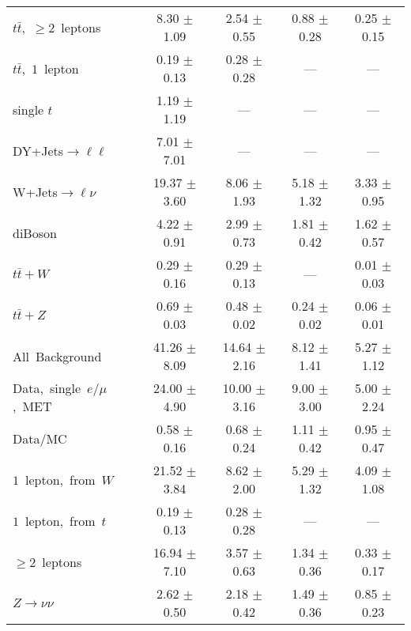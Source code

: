 \documentclass{article}
\begin{document}
\begin{longtable}{|l|c|c|c|c|}
$t\bar{t}$,~$\ge2$~leptons & 8.30 $\pm$ 1.09  & 2.54 $\pm$ 0.55  & 0.88 $\pm$ 0.28  & 0.25 $\pm$ 0.15 \\* 
$t\bar{t}$,~$1$~lepton & 0.19 $\pm$ 0.13  & 0.28 $\pm$ 0.28  & ---  & --- \\* 
single $t$  & 1.19 $\pm$ 1.19  & ---  & ---  & --- \\* 
DY+Jets$\rightarrow\ell\ell$  & 7.01 $\pm$ 7.01  & ---  & ---  & --- \\* 
W+Jets$\rightarrow\ell\nu$  & 19.37 $\pm$ 3.60  & 8.06 $\pm$ 1.93  & 5.18 $\pm$ 1.32  & 3.33 $\pm$ 0.95 \\* 
diBoson  & 4.22 $\pm$ 0.91  & 2.99 $\pm$ 0.73  & 1.81 $\pm$ 0.42  & 1.62 $\pm$ 0.57 \\* 
$t\bar{t}+W$  & 0.29 $\pm$ 0.16  & 0.29 $\pm$ 0.13  & ---  & 0.01 $\pm$ 0.03 \\* 
$t\bar{t}+Z$  & 0.69 $\pm$ 0.03  & 0.48 $\pm$ 0.02  & 0.24 $\pm$ 0.02  & 0.06 $\pm$ 0.01 \\* 
\hline \hline 
All~Background  & 41.26 $\pm$ 8.09  & 14.64 $\pm$ 2.16  & 8.12 $\pm$ 1.41  & 5.27 $\pm$ 1.12 \\* 
Data,~single~$e/\mu$,~MET  & 24.00 $\pm$ 4.90  & 10.00 $\pm$ 3.16  & 9.00 $\pm$ 3.00  & 5.00 $\pm$ 2.24 \\* 
Data/MC  & 0.58 $\pm$ 0.16  & 0.68 $\pm$ 0.24  & 1.11 $\pm$ 0.42  & 0.95 $\pm$ 0.47 \\* 
\hline \hline 
$1$~lepton,~from~$W$  & 21.52 $\pm$ 3.84  & 8.62 $\pm$ 2.00  & 5.29 $\pm$ 1.32  & 4.09 $\pm$ 1.08 \\* 
$1$~lepton,~from~$t$  & 0.19 $\pm$ 0.13  & 0.28 $\pm$ 0.28  & ---  & --- \\* 
$\ge2$~leptons  & 16.94 $\pm$ 7.10  & 3.57 $\pm$ 0.63  & 1.34 $\pm$ 0.36  & 0.33 $\pm$ 0.17 \\* 
$Z\rightarrow\nu\nu$  & 2.62 $\pm$ 0.50  & 2.18 $\pm$ 0.42  & 1.49 $\pm$ 0.36  & 0.85 $\pm$ 0.23 \\* 
\hline 
\end{longtable} 

 
 
 
 
\pagebreak 

 
 
 
 
\end{document}
